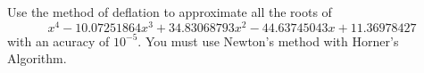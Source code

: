 
\begin{question}
Use the method of deflation to approximate all the roots of
\[
x^4-10.07251864 x^3+34.83068793 x^2-44.63745043 x+11.36978427
\]
with an acuracy of $10^{-5}$.
You must use Newton's method with Horner's Algorithm.
\label{solvAQ38}
\end{question}

